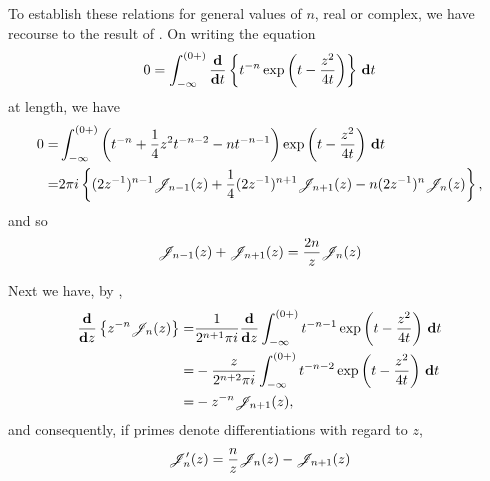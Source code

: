 To establish these relations for general values of $n$, real or
complex, we have recourse to the result of .
On writing the equation
$$
0 = \int_{-\infty}^{(0+)} \frac{\mathbf{d}}{\mathbf{d} t} \left\{  t^{-n}
  \exp\left(  t - \frac{z^{2}}{4t}   \right)   \right\} \, \mathbf{d} t
$$
at length, we have
\begin{align*}
  0 =& \int_{-\infty}^{(0+)}
  \left(  t^{-n} + \frac{1}{4}z^{2} t^{-n-2} - nt^{-n-1}   \right)
  \exp\left(  t - \frac{z^{2}}{4t}   \right)  \, \mathbf{d} t \\
  =& 2\pi i
  \left\{  (2z^{-1})^{n-1} \mathscr{J}_{n-1}(z)
    + \frac{1}{4} (2z^{-1})^{n+1} \mathscr{J}_{n+1}(z)
    - n (2z^{-1})^{n} \mathscr{J}_{n}(z) \right\},
\end{align*}
and so
\begin{equation}
  \mathscr{J}_{n-1}(z) + \mathscr{J}_{n+1}(z) = \frac{2n}{z} \mathscr{J}_{n}(z) 
  \label{eq:bessel:recur}
\end{equation}

Next we have, by ,
\begin{align*}
  \frac{\mathbf{d}}{\mathbf{d} z} \left\{  z^{-n} \mathscr{J}_{n}(z)   \right\}
  =& \frac{1}{2^{n+1}\pi i}
  \frac{\mathbf{d}}{\mathbf{d} z}
  \int_{-\infty}^{(0+)}
  t^{-n-1}
  \exp\left(  t - \frac{z^{2}}{4t}  \right)
  \, \mathbf{d} t
  \\
  =& - \frac{z}{2^{n+2}\pi i}
  \int_{-\infty}^{(0+)}
  t^{-n-2}
  \exp\left(  t - \frac{z^{2}}{4t}  \right)
  \, \mathbf{d} t
  \\
  =& -z^{-n} \mathscr{J}_{n+1}(z),  
\end{align*}
% 
% 
and consequently, if primes denote differentiations with regard to
$z$,
\begin{equation}
  \mathscr{J}'_{n}(z) = \frac{n}{z} \mathscr{J}_{n}(z) - \mathscr{J}_{n+1}(z)
  \label{eq:bessel:deriv}
\end{equation}

